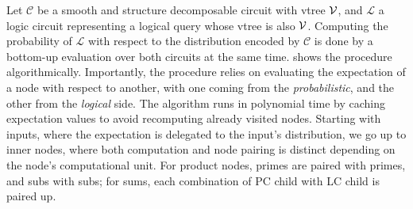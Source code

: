 Let $\mathcal{C}$ be a smooth and structure decomposable circuit with vtree $\operatorname{\mathcal{V}}$, and
$\mathcal{L}$ a logic circuit representing a logical query whose vtree is also $\operatorname{\mathcal{V}}$. Computing
the probability of $\mathcal{L}$ with respect to the distribution encoded by $\mathcal{C}$ is done
by a bottom-up evaluation over both circuits at the same time.  shows the procedure
algorithmically. Importantly, the procedure relies on evaluating the expectation of a node with
respect to another, with one coming from the \emph{probabilistic}, and the other from the
\emph{logical} side. The algorithm runs in polynomial time by caching expectation values to avoid
recomputing already visited nodes. Starting with inputs, where the expectation is delegated to the
input's distribution, we go up to inner nodes, where both computation and node pairing is distinct
depending on the node's computational unit. For product nodes, primes are paired with primes, and
subs with subs; for sums, each combination of PC child with LC child is paired up.

